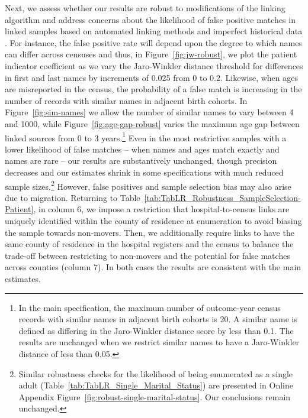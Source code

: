 \documentclass[12pt,english]{article}
\begin{document}
Next, we assess whether our results are robust to modifications of the linking algorithm and address concerns about the likelihood of false positive matches in linked samples based on automated linking methods and imperfect historical data \citep{BaileyColeHendersonMassey2020}. For instance, the false positive rate will depend upon the degree to which names can differ across censuses and thus, in Figure~\ref{fig:jw-robust}, we plot the patient indicator coefficient as we vary the Jaro-Winkler distance threshold for differences in first and last names by increments of 0.025 from 0 to 0.2. Likewise, when ages are misreported in the census, the probability of a false match is increasing in the number of records with similar names in adjacent birth cohorts. In Figure~\ref{fig:sim-names} we allow the number of similar names to vary between 4 and 1000, while Figure~\ref{fig:age-gap-robust} varies the maximum age gap between linked sources from 0 to 3 years.\footnote{In the main specification, the maximum number of outcome-year census records with similar names in adjacent birth cohorts is 20. A similar name is defined as differing
in the Jaro-Winkler distance score by less than 0.1. The results are unchanged when we restrict similar names to have a Jaro-Winkler distance of less than 0.05.} Even in the most restrictive samples with a lower likelihood of false matches -- when names and ages match exactly and names are rare -- our results are substantively unchanged, though precision decreases and our estimates shrink in some specifications with much reduced sample sizes.\footnote{Similar robustness checks for the likelihood of being enumerated as a single adult (Table~\ref{tab:TabLR_Single_Marital_Status}) are presented in Online Appendix Figure~\ref{fig:robust-single-marital-status}. Our conclusions remain unchanged.} However, false positives and sample selection bias may also arise due to migration. Returning to Table~\ref{tab:TabLR_Robustness_SampleSelection-Patient}, in column 6, we impose a restriction that hospital-to-census links are uniquely identified within the county of residence at enumeration to avoid biasing the sample towards non-movers. Then, we additionally require links to have the same county of residence in the hospital registers and the census to balance the trade-off between restricting to non-movers and the potential for false matches across counties (column 7). In both cases the results are consistent with the main estimates.
\end{document}
